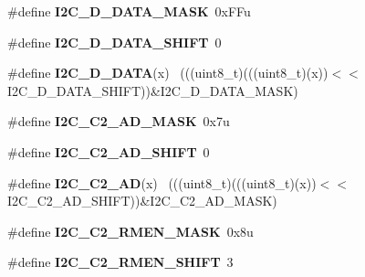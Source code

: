 \begin{DoxyCompactItemize}
\item 
\hypertarget{group___i2_c___register___masks_gaeb11bc3736eba5b805bdc4bced7edb2e}{}\#define {\bfseries I2\+C\+\_\+\+D\+\_\+\+D\+A\+T\+A\+\_\+\+M\+A\+S\+K}~0x\+F\+Fu\label{group___i2_c___register___masks_gaeb11bc3736eba5b805bdc4bced7edb2e}

\item 
\hypertarget{group___i2_c___register___masks_gac9b220edf37227949c367bf455d11a04}{}\#define {\bfseries I2\+C\+\_\+\+D\+\_\+\+D\+A\+T\+A\+\_\+\+S\+H\+I\+F\+T}~0\label{group___i2_c___register___masks_gac9b220edf37227949c367bf455d11a04}

\item 
\hypertarget{group___i2_c___register___masks_gaa23558842a0da229387003292c51e5c3}{}\#define {\bfseries I2\+C\+\_\+\+D\+\_\+\+D\+A\+T\+A}(x)                                                    ~(((uint8\+\_\+t)(((uint8\+\_\+t)(x))$<$$<$I2\+C\+\_\+\+D\+\_\+\+D\+A\+T\+A\+\_\+\+S\+H\+I\+F\+T))\&I2\+C\+\_\+\+D\+\_\+\+D\+A\+T\+A\+\_\+\+M\+A\+S\+K)\label{group___i2_c___register___masks_gaa23558842a0da229387003292c51e5c3}

\item 
\hypertarget{group___i2_c___register___masks_ga6c5f8db3bac4c51de9446448a8ad9072}{}\#define {\bfseries I2\+C\+\_\+\+C2\+\_\+\+A\+D\+\_\+\+M\+A\+S\+K}~0x7u\label{group___i2_c___register___masks_ga6c5f8db3bac4c51de9446448a8ad9072}

\item 
\hypertarget{group___i2_c___register___masks_gab875d484e12dc6ae427c2063430d1362}{}\#define {\bfseries I2\+C\+\_\+\+C2\+\_\+\+A\+D\+\_\+\+S\+H\+I\+F\+T}~0\label{group___i2_c___register___masks_gab875d484e12dc6ae427c2063430d1362}

\item 
\hypertarget{group___i2_c___register___masks_gad82ab5552b298f66f970ca92c4a2610e}{}\#define {\bfseries I2\+C\+\_\+\+C2\+\_\+\+A\+D}(x)                                                      ~(((uint8\+\_\+t)(((uint8\+\_\+t)(x))$<$$<$I2\+C\+\_\+\+C2\+\_\+\+A\+D\+\_\+\+S\+H\+I\+F\+T))\&I2\+C\+\_\+\+C2\+\_\+\+A\+D\+\_\+\+M\+A\+S\+K)\label{group___i2_c___register___masks_gad82ab5552b298f66f970ca92c4a2610e}

\item 
\hypertarget{group___i2_c___register___masks_ga70911373d5619a4d8376777446085856}{}\#define {\bfseries I2\+C\+\_\+\+C2\+\_\+\+R\+M\+E\+N\+\_\+\+M\+A\+S\+K}~0x8u\label{group___i2_c___register___masks_ga70911373d5619a4d8376777446085856}

\item 
\hypertarget{group___i2_c___register___masks_ga802a10e2d279895ec0230b4701b1a4bf}{}\#define {\bfseries I2\+C\+\_\+\+C2\+\_\+\+R\+M\+E\+N\+\_\+\+S\+H\+I\+F\+T}~3\label{group___i2_c___register___masks_ga802a10e2d279895ec0230b4701b1a4bf}


\end{DoxyCompactItemize}
